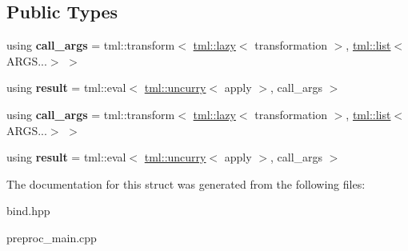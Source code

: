 \subsection*{Public Types}
\begin{DoxyCompactItemize}
\item 
\hypertarget{structtml_1_1impl_1_1bind__call_3_01tml_1_1impl_1_1bind_3_01F_00_01ARGS_8_8_8_4_00_01CARGS_8_8_8_4_a92eef5b5f7b56d49c6603275dc2b6cf5}{using {\bfseries call\+\_\+args} = tml\+::transform$<$ \hyperlink{structtml_1_1lazy}{tml\+::lazy}$<$ transformation $>$, \hyperlink{structtml_1_1list}{tml\+::list}$<$ A\+R\+G\+S...$>$ $>$}\label{structtml_1_1impl_1_1bind__call_3_01tml_1_1impl_1_1bind_3_01F_00_01ARGS_8_8_8_4_00_01CARGS_8_8_8_4_a92eef5b5f7b56d49c6603275dc2b6cf5}

\item 
\hypertarget{structtml_1_1impl_1_1bind__call_3_01tml_1_1impl_1_1bind_3_01F_00_01ARGS_8_8_8_4_00_01CARGS_8_8_8_4_a204ea8e2d414633d6158ec4bf142d8ce}{using {\bfseries result} = tml\+::eval$<$ \hyperlink{structtml_1_1uncurry}{tml\+::uncurry}$<$ apply $>$, call\+\_\+args $>$}\label{structtml_1_1impl_1_1bind__call_3_01tml_1_1impl_1_1bind_3_01F_00_01ARGS_8_8_8_4_00_01CARGS_8_8_8_4_a204ea8e2d414633d6158ec4bf142d8ce}

\item 
\hypertarget{structtml_1_1impl_1_1bind__call_3_01tml_1_1impl_1_1bind_3_01F_00_01ARGS_8_8_8_4_00_01CARGS_8_8_8_4_a92eef5b5f7b56d49c6603275dc2b6cf5}{using {\bfseries call\+\_\+args} = tml\+::transform$<$ \hyperlink{structtml_1_1lazy}{tml\+::lazy}$<$ transformation $>$, \hyperlink{structtml_1_1list}{tml\+::list}$<$ A\+R\+G\+S...$>$ $>$}\label{structtml_1_1impl_1_1bind__call_3_01tml_1_1impl_1_1bind_3_01F_00_01ARGS_8_8_8_4_00_01CARGS_8_8_8_4_a92eef5b5f7b56d49c6603275dc2b6cf5}

\item 
\hypertarget{structtml_1_1impl_1_1bind__call_3_01tml_1_1impl_1_1bind_3_01F_00_01ARGS_8_8_8_4_00_01CARGS_8_8_8_4_a204ea8e2d414633d6158ec4bf142d8ce}{using {\bfseries result} = tml\+::eval$<$ \hyperlink{structtml_1_1uncurry}{tml\+::uncurry}$<$ apply $>$, call\+\_\+args $>$}\label{structtml_1_1impl_1_1bind__call_3_01tml_1_1impl_1_1bind_3_01F_00_01ARGS_8_8_8_4_00_01CARGS_8_8_8_4_a204ea8e2d414633d6158ec4bf142d8ce}

\end{DoxyCompactItemize}


The documentation for this struct was generated from the following files\+:\begin{DoxyCompactItemize}
\item 
bind.\+hpp\item 
preproc\+\_\+main.\+cpp\end{DoxyCompactItemize}
